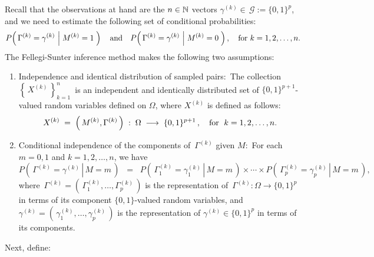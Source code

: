 \vskip 0.5cm
\begin{remark}
\mbox{}\vskip 0.05cm
\noindent
Recall that the observations at hand are the $n \in \mathbb{N}$ vectors $\gamma^{(k)} \in \, \mathcal{G} := \{0,1\}^{p}$, and
we need to estimate the following set of conditional probabilities:
\begin{equation*}
P\!\left(\,
	\Gamma^{(k)}=\gamma^{(k)}\,
	\left\vert\;M^{(k)} = \overset{{\color{white}.}}{1}\right.
	\,\right)
\quad\textnormal{and}\quad
P\!\left(\,
	\Gamma^{(k)}=\gamma^{(k)}\,
	\left\vert\;M^{(k)} = \overset{{\color{white}.}}{0}\right.
	\,\right),
\quad
\textnormal{for $k = 1,2,\ldots,n$}.
\end{equation*}
The Fellegi-Sunter inference method makes the following two assumptions:
\begin{enumerate}
\item
	Independence and identical distribution of sampled pairs:\,
	The collection \,$\left\{\,X^{(k)}\,\right\}_{k=1}^{n}$\, is an
	independent and identically distributed set of $\{0,1\}^{p+1}$-valued
	random variables defined on $\Omega$, where $X^{(k)}$ is defined as follows:
	\begin{equation*}
	X^{(k)} \;=\; \left(\,M^{(k)},\Gamma^{(k)}\,\right) \;:\; \Omega \;\longrightarrow \; \{0,1\}^{p+1}\,,
	\quad
	\textnormal{for \;$k = 1,2,\ldots,n$}.
	\end{equation*}
\item
	Conditional independence of the components of \,$\Gamma^{(k)}$ given $M$:\,
	For each $m = 0,1$ and $k = 1,2,\ldots,n$, we have
	\begin{equation*}
	P\!\left(\,\left.\Gamma^{(k)} = \gamma^{(k)} \,\right\vert\, M = m\,\right)
	\;\; = \;\;
	P\!\left(\,\left.\Gamma^{(k)}_{1} = \gamma^{(k)}_{1} \,\right\vert\, M = m\,\right)
	\times \cdots \times
	P\!\left(\,\left.\Gamma^{(k)}_{p} = \gamma^{(k)}_{p} \,\right\vert\, M = m\,\right),
	\end{equation*}
	where \,$\Gamma^{(k)} = \left(\,\Gamma^{(k)}_{1},\ldots,\Gamma^{(k)}_{p}\,\right)$
	is the representation of \,$\Gamma^{(k)} : \Omega \longrightarrow \{0,1\}^{p}$
	in terms of its component $\{0,1\}$-valued random variables, and
	\,$\gamma^{(k)} = \left(\,\gamma^{(k)}_{1},\ldots,\gamma^{(k)}_{p}\,\right)$
	is the representation of $\gamma^{(k)} \in \{0,1\}^{p}$ in terms of its components.
\end{enumerate}
Next, define:
\begin{equation*}

\end{equation*}
\end{remark}
